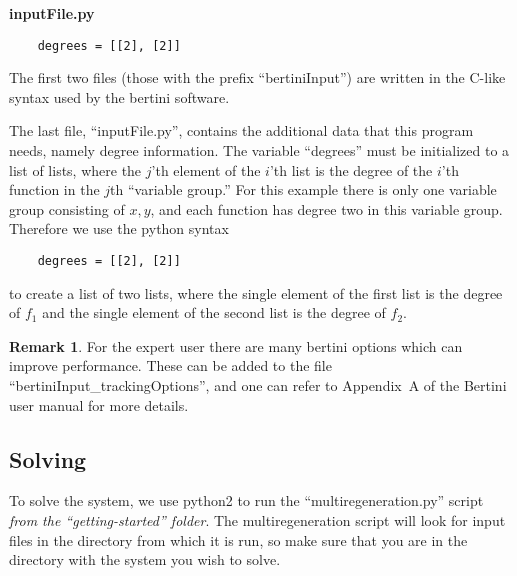 \documentclass[12pt]{article}
\theoremstyle{definition}
\newtheorem{remark}{Remark}[section]
\begin{document}
\noindent \textbf{inputFile.py}

\begin{leftbar}
\vspace{-10pt} 
\begin{verbatim}
    degrees = [[2], [2]]
\end{verbatim}\vspace{-10pt} 
\end{leftbar}

The first two files (those with the prefix ``bertiniInput'') are 
written in the C-like syntax used by the bertini software. 

The last 
file, ``inputFile.py'', contains the additional data that this 
program needs, namely degree information. 
The variable ``degrees'' must be initialized to a list of lists, where 
the $j$'th element of the $i$'th list is the degree of the $i$'th 
function in the $j$th ``variable group.'' For this example there is only 
one variable group consisting of $x,y$, and each function has degree two 
in this variable group. Therefore we use the python syntax
%
\begin{leftbar}
\vspace{-10pt} 
\begin{verbatim}
    degrees = [[2], [2]]
\end{verbatim}\vspace{-10pt} 
\end{leftbar}
\noindent to create a list of two lists, where the single element of the first 
list is the degree of $f_1$ and the single element of the second list is 
the degree of $f_2$.


\begin{remark}
For the expert user there are many bertini options which can 
improve performance. These can be added 
to the file ``bertiniInput\_trackingOptions'', and one can refer to Appendix~A of the  Bertini user manual for more details. 
\end{remark}


\subsection{Solving}
To solve the system, we use python2 to run the ``multiregeneration.py'' 
script \emph{from the ``getting-started'' folder}. The multiregeneration 
script will look for input files in the directory from which it is run, 
so make sure that you are in the directory with the system you wish to 
solve. 
\end{document}
